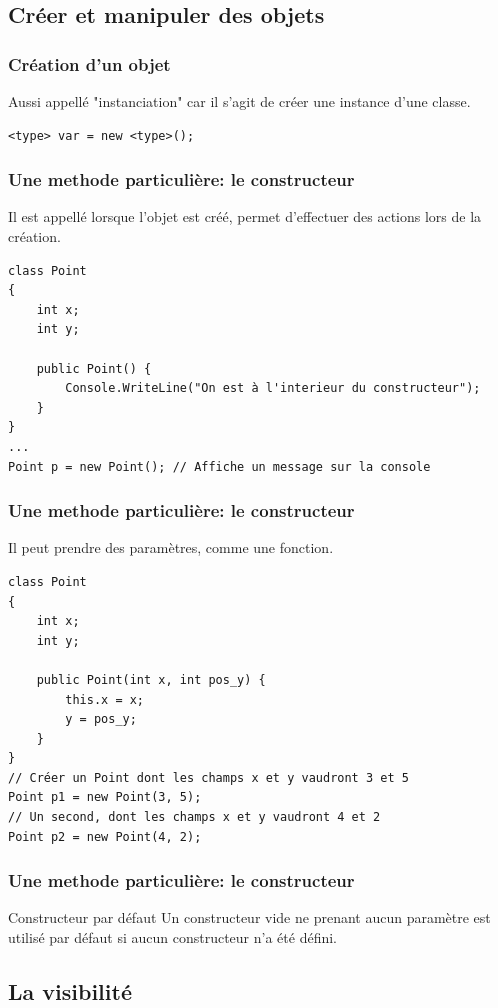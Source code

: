 \documentclass{beamer}
\begin{document}
\subsection{Créer et manipuler des objets}

\begin{frame}[fragile]
\frametitle{Création d'un objet}
Aussi appellé "instanciation" car il s'agit de créer une instance d'une classe.
\begin{lstlisting}
<type> var = new <type>();
\end{lstlisting}
\end{frame}

\begin{frame}[fragile]
\frametitle{Une methode particulière: le constructeur}
Il est appellé lorsque l'objet est créé, permet d'effectuer des actions lors de la création.
\begin{lstlisting}
class Point
{
    int x;
    int y;
    
    public Point() {
        Console.WriteLine("On est à l'interieur du constructeur");
    }
}
...
Point p = new Point(); // Affiche un message sur la console
\end{lstlisting}
\end{frame}

\begin{frame}[fragile]
\frametitle{Une methode particulière: le constructeur}
Il peut prendre des paramètres, comme une fonction.
\begin{lstlisting}
class Point
{
    int x;
    int y;

    public Point(int x, int pos_y) {
        this.x = x;
        y = pos_y;
    }
}
// Créer un Point dont les champs x et y vaudront 3 et 5
Point p1 = new Point(3, 5);
// Un second, dont les champs x et y vaudront 4 et 2
Point p2 = new Point(4, 2);
\end{lstlisting}
\end{frame}

\begin{frame}
\frametitle{Une methode particulière: le constructeur}
\begin{alertblock}{Constructeur par défaut}
Un constructeur vide ne prenant aucun paramètre est utilisé par défaut si aucun constructeur n'a été défini.
\end{alertblock}
\end{frame}

\subsection{La visibilité}
\end{document}
